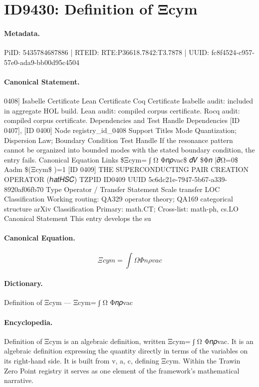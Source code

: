 \section*{ID9430: Definition of Ξcym}
\paragraph{Metadata.}
PiID: 5435784687886 | RTEID: RTE:P36618.7842:T3.7878 | UUID: fc8f4524-c957-57e0-ada9-bb00d95c4504

\paragraph{Canonical Statement.}
0408] Isabelle Certificate Lean Certificate Coq Certificate Isabelle audit: included in aggregate HOL build. Lean audit: compiled corpus certificate. Rocq audit: compiled corpus certificate. Dependencies and Test Handle Dependencies [ID 0407], [ID 0400] Node registry\_id\_0408 Support Titles Mode Quantization; Dispersion Law; Boundary Condition Test Handle If the resonance pattern cannot be organized into bounded modes with the stated boundary condition, the entry fails. Canonical Equation Links \$Ξcym= ∫ Ω Φ𝑛𝜌vac\$ 𝑑𝑉 \$Φ𝑛 |𝜕Ω=0\$ Aadm \$(Ξcym\$ )=1 [ID 0409] THE SUPERCONDUCTING PAIR CREATION OPERATOR (ℎ𝑎𝑡𝐻𝑆𝐶) TZPID ID0409 UUID 5c6dc21e-7947-5b67-a339-8920af06fb70 Type Operator / Transfer Statement Scale transfer LOC Classification Working routing: QA329 operator theory; QA169 categorical structure arXiv Classification Primary: math.CT; Cross-list: math-ph, cs.LO Canonical Statement This entry develops the su

\paragraph{Canonical Equation.}
\[
Ξcym= ∫ Ω Φ𝑛𝜌vac
\]

\paragraph{Dictionary.}
Definition of Ξcym — Ξcym= ∫ Ω Φ𝑛𝜌vac

\paragraph{Encyclopedia.}
Definition of Ξcym is an algebraic definition, written Ξcym= ∫ Ω Φ𝑛𝜌vac. It is an algebraic definition expressing the quantity directly in terms of the variables on its right-hand side. It is built from v, a, c, defining Ξcym. Within the Trawin Zero Point registry it serves as one element of the framework's mathematical narrative.
